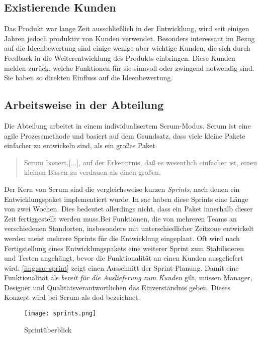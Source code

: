 \subsection{Existierende Kunden}
Das Produkt war lange Zeit ausschließlich in der Entwicklung, wird seit einigen Jahren jedoch produktiv von Kunden verwendet. Besonders 
interessant im Bezug auf die Ideenbewertung sind einige wenige aber wichtige Kunden, die sich durch Feedback in die 
Weiterentwicklung des Produkts einbringen. Diese Kunden melden zurück, welche Funktionen für sie sinnvoll oder 
zwingend notwendig sind. Sie haben so direkten Einfluss auf die Ideenbewertung. 

\subsection{Arbeitsweise in der Abteilung}
Die Abteilung arbeitet in einem individualisertem Scrum-Modus. Scrum ist eine agile Prozessmethode und basiert 
auf dem Grundsatz, dass viele kleine Pakete einfacher zu entwickeln sind, als ein großes Paket. 
\begin{quote} Scrum basiert,[...], auf der Erkenntnis, daß es wesentlich einfacher ist, einen kleinen Bissen zu verdauen als einen großen.\cite{scrum:2018} \end{quote} 
Der Kern von Scrum sind die vergleichsweise kurzen \textit{Sprints}, nach denen ein Entwicklungspaket implementiert wurde. 
In \ac{sac} haben diese Sprints eine Länge von zwei Wochen. Dies bedeutet allerdings nicht, dass ein Paket 
innerhalb dieser Zeit fertiggestellt werden muss.Bei Funktionen, die von mehreren Teams an
verschiedenen Standorten, insbesondere mit unterschiedlicher Zeitzone entwickelt werden meist mehrere Sprints für die Entwicklung eingeplant.
Oft wird nach Fertigstellung eines Entwicklungspakets eine weiterer Sprint zum Stabilisieren und Testen angehängt, bevor die Funktionalität an einen Kunden
ausgeliefert wird. \autoref{img:sac-sprint} zeigt einen Ausschnitt der Sprint-Planung.
Damit eine Funktionalität als \textit{bereit für die Auslieferung zum Kunden} gilt, müssen Manager, Designer und Qualitätsverantwortlichen das 
Einverständnis geben. Dieses Konzept wird bei Scrum als \ac{dod} bezeichnet. 
\begin{figure}[ht]
	\centering
	\texttt{[image: sprints.png]}
	\caption{Sprintüberblick}
	\label{img:sac-sprint}
\end{figure}



